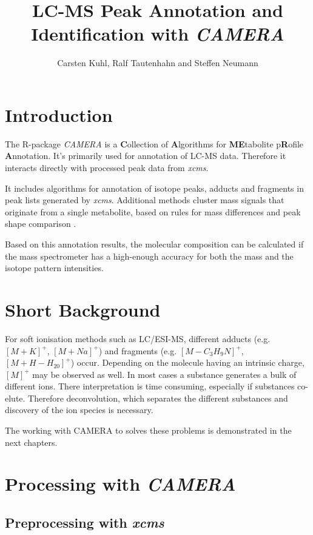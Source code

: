 \documentclass[a4paper,12pt]{article}
\newcommand{\Rpackage}[1]{{\textit{#1}}}
\begin{document}
\title{LC-MS Peak Annotation and Identification with \Rpackage{CAMERA}}
\author{Carsten Kuhl, Ralf Tautenhahn and Steffen Neumann}
\maketitle

\section{Introduction}

The R-package \Rpackage{CAMERA} is a {\bf C}ollection of {\bf
A}lgorithms for {\bf ME}tabolite p{\bf R}ofile {\bf A}nnotation. It's
primarily  used for annotation of LC-MS data. Therefore it interacts
directly with processed peak data from \Rpackage{xcms}.

It includes algorithms for annotation of isotope peaks,
adducts and fragments in peak lists generated by \Rpackage{xcms}. Additional
methods cluster mass signals that originate from a single metabolite, based on
rules for mass differences and peak shape comparison \cite{annobird07}.

Based on this annotation results, the molecular composition can be calculated
if the mass spectrometer has a high-enough accuracy for both the mass
and the isotope pattern intensities.



\section{Short Background}
For soft ionisation methods such as LC/ESI-MS, different adducts (e.g.
$[M+K]^+$, $[M+Na]^+ $) and fragments (e.g.  $[M-C_3H_9N]^+$,
$[M+H-H_20]^+ $) occur. Depending on the molecule having an intrinsic
charge, $[M]^+$ may be observed as well. In most cases a substance generates a
bulk of different ions. There interpretation is time consuming, especially if
substances co-elute. Therefore deconvolution, which separates the different
substances and discovery of the ion species is necessary. 

The working with CAMERA to solves these problems is demonstrated in the next
chapters.

\section{Processing with \Rpackage{CAMERA}}

\subsection{Preprocessing with \Rpackage{xcms}}
\label{preprocess}
\end{document}
